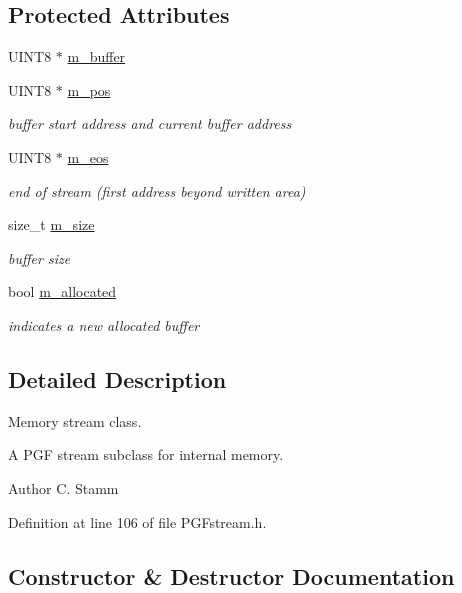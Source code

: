 \subsection*{Protected Attributes}
\begin{DoxyCompactItemize}
\item 
U\+I\+N\+T8 $\ast$ \mbox{\hyperlink{classCPGFMemoryStream_a9d4c1baa334c288fba0f5e4fc9e9a31e}{m\+\_\+buffer}}
\item 
U\+I\+N\+T8 $\ast$ \mbox{\hyperlink{classCPGFMemoryStream_a901356d38f0aee983fa19bff73727ec6}{m\+\_\+pos}}
\begin{DoxyCompactList}\small\item\em buffer start address and current buffer address \end{DoxyCompactList}\item 
U\+I\+N\+T8 $\ast$ \mbox{\hyperlink{classCPGFMemoryStream_a7c0a47341ab8962728284db230b44203}{m\+\_\+eos}}
\begin{DoxyCompactList}\small\item\em end of stream (first address beyond written area) \end{DoxyCompactList}\item 
size\+\_\+t \mbox{\hyperlink{classCPGFMemoryStream_a640b0fa8b5cfef4ea4d25adc7bf30ffa}{m\+\_\+size}}
\begin{DoxyCompactList}\small\item\em buffer size \end{DoxyCompactList}\item 
bool \mbox{\hyperlink{classCPGFMemoryStream_ad067b8fcb304992bc8596d634fbbe20b}{m\+\_\+allocated}}
\begin{DoxyCompactList}\small\item\em indicates a new allocated buffer \end{DoxyCompactList}\end{DoxyCompactItemize}


\subsection{Detailed Description}
Memory stream class. 

A P\+GF stream subclass for internal memory. \begin{DoxyAuthor}{Author}
C. Stamm 
\end{DoxyAuthor}


Definition at line 106 of file P\+G\+Fstream.\+h.



\subsection{Constructor \& Destructor Documentation}
\mbox{\label{classCPGFMemoryStream_a04270a0cc3b62a272c11289931e91986}} 
